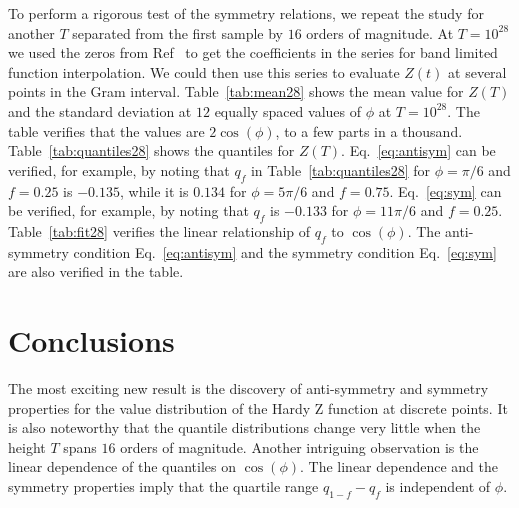 \documentclass[twoside]{article}
\begin{document}
To perform a rigorous test of the symmetry relations, we repeat the study for another $T$ separated from the first sample by $16$ orders of magnitude. At $T=10^{28}$ we used the  zeros from Ref~\cite{hiary 2010} to get the coefficients in the series for band limited function interpolation. We could then use this series to evaluate  $Z(t)$  at several points in the Gram interval.
Table~\ref{tab:mean28} shows the mean value for $Z(T)$  and the standard deviation at $12$ equally spaced values of $\phi$ at $T=10^{28}$. The table verifies that the values are $2\cos(\phi)$, to a few parts in a thousand. Table~\ref{tab:quantiles28} shows the quantiles for $Z(T)$.  Eq.~\ref{eq:antisym} can be verified, for example, by noting that $q_f$ in Table~\ref{tab:quantiles28}
for $\phi=\pi/6$ and $f=0.25$ is $-0.135$, while it is $0.134$ for $\phi=5\pi/6$ and $f=0.75$. Eq.~\ref{eq:sym} can be verified, for example, by noting that $q_f$ is $-0.133$ for $\phi=11\pi/6$ and $f=0.25$. Table~\ref{tab:fit28} verifies the linear relationship of $q_f$ to $\cos(\phi)$. The anti-symmetry condition Eq.~\ref{eq:antisym}  and the symmetry condition Eq.~\ref{eq:sym} are also verified in the table.

\section{\label{conclusions}Conclusions}

The most exciting new result is the discovery of anti-symmetry and symmetry properties for the value distribution of the Hardy Z function at discrete points. It is also noteworthy that the quantile distributions change very little when the height $T$ spans $16$ orders of magnitude. Another intriguing observation is the linear dependence of the quantiles on $\cos(\phi)$. The linear dependence and the symmetry properties imply that the quartile range $q_{1-f}-q_f$ is independent of $\phi$.
\end{document}
